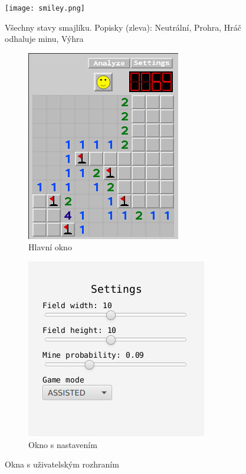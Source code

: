 \begin{figure}
    \centering
    \texttt{[image: smiley.png]}
    \caption{Všechny stavy smajlíku. Popisky (zleva): Neutrální, Prohra, Hráč odhaluje minu, Výhra}
    \label{fig:stavy smajlíku}
\end{figure}

\begin{figure}
    \centering
    \begin{subfigure}[b]{0.3\textwidth}
        \centering
        \includegraphics[scale=0.5]{images/okno1.png}
        \caption{Hlavní okno}
        \label{fig:okno1}
    \end{subfigure}
    \begin{subfigure}[b]{0.3\textwidth}
        \centering
        \includegraphics[scale=0.5]{images/okno2.png}
        \caption{Okno s nastavením}
        \label{fig:okno2}
    \end{subfigure}
    \caption{Okna s uživatelským rozhraním}
    \label{fig:okna}
\end{figure}

